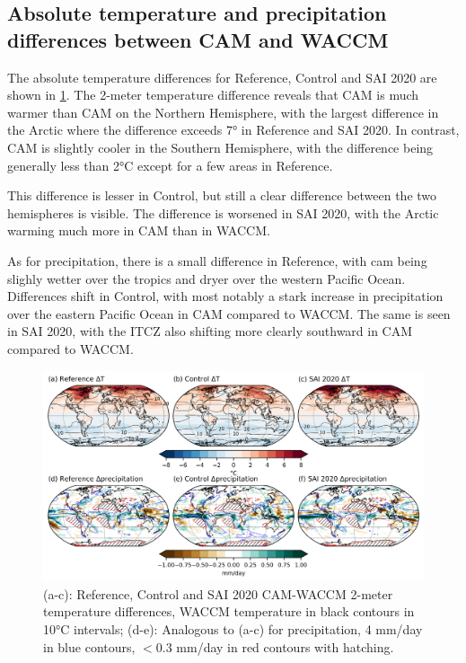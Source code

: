 \subsection{Absolute temperature and precipitation differences between CAM and WACCM}
The absolute temperature differences for Reference, Control and SAI 2020 are shown in \ref{fig:CAM_WACCM}. The 2-meter temperature difference reveals that CAM is much warmer than CAM on the Northern Hemisphere, with the largest difference in the Arctic where the difference exceeds 7° in Reference and SAI 2020. In contrast, CAM is slightly cooler in the Southern Hemisphere, with the difference being generally less than 2°C except for a few areas in Reference.

This difference is lesser in Control, but still a clear difference between the two hemispheres is visible. The difference is worsened in SAI 2020, with the Arctic warming much more in CAM than in WACCM. 

As for precipitation, there is a small difference in Reference, with cam being slighly wetter over the tropics and dryer over the western Pacific Ocean. Differences shift in Control, with most notably a stark increase in precipitation over the eastern Pacific Ocean in CAM compared to WACCM. The same is seen in SAI 2020, with the ITCZ also shifting more clearly southward in CAM compared to WACCM. 

\begin{figure}[H]
	\centering
	\includegraphics[width=0.95\linewidth]{images/CAM_WACCM.png}
	\caption{(a-c): Reference, Control and SAI 2020 CAM-WACCM 2-meter temperature differences, WACCM temperature in black contours in 10°C intervals; (d-e): Analogous to (a-c) for precipitation, 4 mm/day in blue contours, $<0.3$ mm/day in red contours with hatching.}
	\label{fig:CAM_WACCM}
\end{figure}


